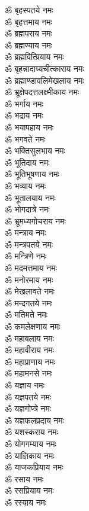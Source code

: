 \begin{multicols}{2}
\begin{flushleft}
ॐ बृहस्पतये नमः\\
ॐ बृहत्तमाय नमः\\
ॐ ब्रह्मपराय नमः\\
ॐ ब्रह्मण्याय नमः\\
ॐ ब्रह्मवित्प्रियाय नमः\hfill{}\\
ॐ बृहन्नादाग्र्यचीत्काराय नमः\\
ॐ ब्रह्माण्डावलिमेखलाय नमः\\
ॐ भ्रूक्षेपदत्तलक्ष्मीकाय नमः\\
ॐ भर्गाय नमः\\
ॐ भद्राय नमः\\
ॐ भयापहाय नमः\\
ॐ भगवते नमः\\
ॐ भक्तिसुलभाय नमः\\
ॐ भूतिदाय नमः\\
ॐ भूतिभूषणाय नमः\hfill{}\\
ॐ भव्याय नमः\\
ॐ भूतालयाय नमः\\
ॐ भोगदात्रे नमः\\
ॐ भ्रूमध्यगोचराय नमः\\
ॐ मन्त्राय नमः\\
ॐ मन्त्रपतये नमः\\
ॐ मन्त्रिणे नमः\\
ॐ मदमत्तमाय नमः\\
ॐ मनोरमाय नमः\\
ॐ मेखलावते नमः\hfill{}\\
ॐ मन्दगतये नमः\\
ॐ मतिमते नमः\\
ॐ कमलेक्षणाय नमः\\
ॐ महाबलाय नमः\\
ॐ महावीराय नमः\\
ॐ महाप्राणाय नमः\\
ॐ महामनसे नमः\\
ॐ यज्ञाय नमः\\
ॐ यज्ञपतये नमः\\
ॐ यज्ञगोप्त्रे नमः\hfill{}\\
ॐ यज्ञफलप्रदाय नमः\\
ॐ यशस्कराय नमः\\
ॐ योगगम्याय नमः\\
ॐ याज्ञिकाय नमः\\
ॐ याजकप्रियाय नमः\\
ॐ रसाय नमः\\
ॐ रसप्रियाय नमः\\
ॐ रस्याय नमः\\

\end{flushleft}
\end{multicols}
